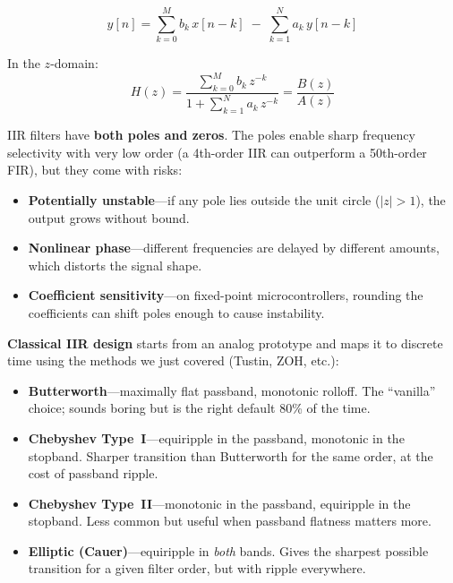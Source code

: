 \begin{equation}
y[n] = \sum_{k=0}^{M} b_k \, x[n-k] \;-\; \sum_{k=1}^{N} a_k \, y[n-k]
\end{equation}

In the $z$-domain:
\begin{equation}
H(z) = \frac{\displaystyle\sum_{k=0}^{M} b_k \, z^{-k}}
            {1 + \displaystyle\sum_{k=1}^{N} a_k \, z^{-k}}
     = \frac{B(z)}{A(z)}
\end{equation}

IIR filters have \textbf{both poles and zeros}. The poles enable sharp frequency
selectivity with very low order (a 4th-order IIR can outperform a 50th-order FIR),
but they come with risks:
\begin{itemize}
    \item \textbf{Potentially unstable}---if any pole lies outside the unit circle
          ($|z| > 1$), the output grows without bound.
    \item \textbf{Nonlinear phase}---different frequencies are delayed by different
          amounts, which distorts the signal shape.
    \item \textbf{Coefficient sensitivity}---on fixed-point microcontrollers,
          rounding the coefficients can shift poles enough to cause instability.
\end{itemize}

\textbf{Classical IIR design} starts from an analog prototype and maps it to
discrete time using the methods we just covered (Tustin, ZOH, etc.):
\begin{itemize}
    \item \textbf{Butterworth}---maximally flat passband, monotonic rolloff. The
          ``vanilla'' choice; sounds boring but is the right default 80\% of the time.
    \item \textbf{Chebyshev Type~I}---equiripple in the passband, monotonic in the
          stopband. Sharper transition than Butterworth for the same order, at the
          cost of passband ripple.
    \item \textbf{Chebyshev Type~II}---monotonic in the passband, equiripple in the
          stopband. Less common but useful when passband flatness matters more.
    \item \textbf{Elliptic (Cauer)}---equiripple in \textit{both} bands. Gives the
          sharpest possible transition for a given filter order, but with ripple
          everywhere.
\end{itemize}

